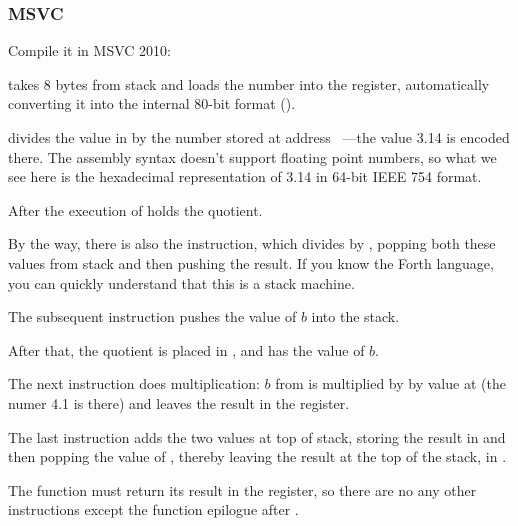 \subsubsection{MSVC}

Compile it in MSVC 2010:



\FLD takes 8 bytes from stack and loads the number into the  register, automatically converting 
it into the internal 80-bit format ().


\FDIV divides the value in  by the number stored at address 
~---the value 3.14 is encoded there. 
The assembly syntax doesn't support floating point numbers, so 
what we see here is the hexadecimal representation of 3.14 in 64-bit IEEE 754 format.

After the execution of \FDIV {} holds the \gls{quotient}.


By the way, there is also the \FDIVP instruction, which divides  by , 
popping both these values from stack and then pushing the result. 
If you know the Forth language\FNURLFORTH,
you can quickly understand that this is a stack machine\FNURLSTACK.

The subsequent \FLD instruction pushes the value of $b$ into the stack.

After that, the quotient is placed in , and  has the value of $b$.


The next \FMUL instruction does multiplication: $b$ from  is multiplied by by value at 
 (the numer 4.1 is there) and leaves the result in the  register.


The last \FADDP instruction adds the two values at top of stack, storing the result in  
and then popping the value of , thereby leaving the result at the top of the stack, in .

The function must return its result in the  register, 
so there are no any other instructions except the function epilogue after \FADDP.



